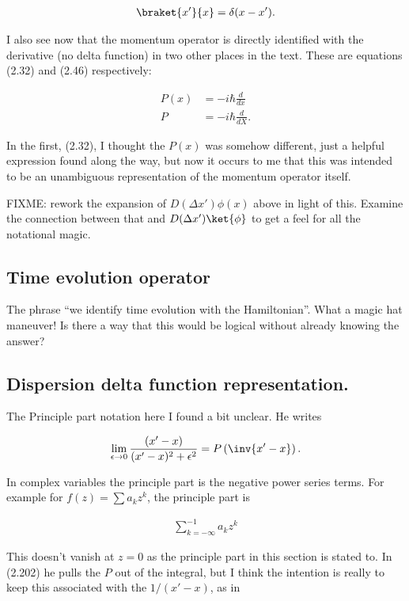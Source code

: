 \begin{align*}
\braket{x'}{x} = \delta(x-x').
\end{align*}

I also see now that the momentum operator is directly identified with the derivative (no delta function) in two other places in the text.  These are equations (2.32) and (2.46) respectively:

\begin{align*}
P(x) &= -i \hbar \frac{d}{dx} \\
P &= -i \hbar \frac{d}{dX}.
\end{align*}

In the first, (2.32), I thought the $P(x)$ was somehow different, just a helpful expression found along the way, but now it occurs to me that this was intended to be an unambiguous representation of the momentum operator itself.

FIXME: rework the expansion of $D(\Delta x') \phi(x)$ above in light of this.  Examine the connection between that and 
$D(\Delta x') \ket{\phi}$ to get a feel for all the notational magic.

\subsection{Time evolution operator}

The phrase ``we identify time evolution with the Hamiltonian''.  What a magic hat maneuver!  Is there a way that this would be logical without already knowing the answer?

\subsection{Dispersion delta function representation.}

The Principle part notation here I found a bit unclear.  He writes

\begin{align*}
\lim_{\epsilon \rightarrow 0} 
\frac{(x'-x)}{(x'-x)^2 + \epsilon^2}
= 
P\left( \inv{x' - x} \right).
\end{align*}

In complex variables the principle part is the negative power series terms.  For example for $f(z) = \sum a_k z^k$, the principle part is

\begin{align*}
\sum_{k = -\infty}^{-1} a_k z^k
\end{align*}

This doesn't vanish at $z = 0$ as the principle part in this section is stated to.  In (2.202) he pulls the $P$ out of the integral, but I think the intention is really to keep this associated with the $1/(x'-x)$, as in

